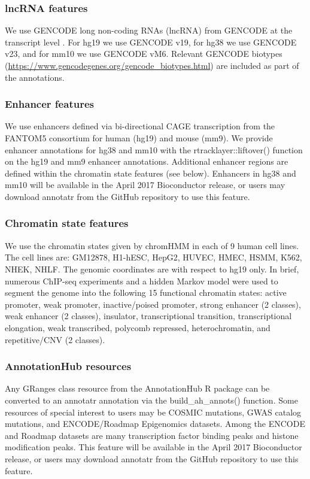 \subsubsection{lncRNA features}
We use GENCODE long non-coding RNAs (lncRNA) from GENCODE at the transcript level \cite{Harrow:2012cx}. For hg19 we use GENCODE v19, for hg38 we use GENCODE v23, and for mm10 we use GENCODE vM6. Relevant GENCODE biotypes (\url{https://www.gencodegenes.org/gencode_biotypes.html}) are included as part of the annotations.

\subsubsection{Enhancer features}
We use enhancers defined via bi-directional CAGE transcription from the FANTOM5 consortium \cite{Andersson:2014bn} for human (hg19) and mouse (mm9). We provide enhancer annotations for hg38 and mm10 with the rtracklayer::liftover() function on the hg19 and mm9 enhancer annotations. Additional enhancer regions are defined within the chromatin state features (see below). Enhancers in hg38 and mm10 will be available in the April 2017 Bioconductor release, or users may download annotatr from the GitHub repository to use this feature.

\subsubsection{Chromatin state features}
We use the chromatin states given by chromHMM \cite{Ernst:2012ii} in each of 9 human cell lines. The cell lines are: GM12878, H1-hESC, HepG2, HUVEC, HMEC, HSMM, K562, NHEK, NHLF. The genomic coordinates are with respect to hg19 only. In brief, numerous ChIP-seq experiments and a hidden Markov model were used to segment the genome into the following 15 functional chromatin states: active promoter, weak promoter, inactive/poised promoter, strong enhancer (2 classes), weak enhancer (2 classes), insulator, transcriptional transition, transcriptional elongation, weak transcribed, polycomb repressed, heterochromatin, and repetitive/CNV (2 classes).

\subsubsection{AnnotationHub resources}
Any GRanges class resource from the AnnotationHub R package can be converted to an annotatr annotation via the build\_ah\_annots() function. Some resources of special interest to users may be COSMIC mutations, GWAS catalog mutations, and ENCODE/Roadmap Epigenomics datasets. Among the ENCODE and Roadmap datasets are many transcription factor binding peaks and histone modification peaks. This feature will be available in the April 2017 Bioconductor release, or users may download annotatr from the GitHub repository to use this feature.

